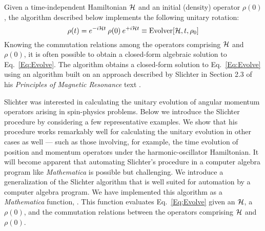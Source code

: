 %
%
%
%
%
%
%
%
%

\cite{Helton2015feb} \cite{Levitt2015mar}

Given a time-independent Hamiltonian ${\cal H}$ and an initial (density) operator $\rho(0)$, the  algorithm described below implements the following unitary rotation:
\begin{equation}
\rho(t) 
	= e^{-i {\cal H} t} \: \rho(0) \: e^{+i {\cal H} t}
	\equiv \text{{Evolver}}[{\cal H},t,\rho_0]
	\label{Eq:Evolve}
\end{equation}
Knowing the commutation relations among the operators comprising ${\cal H}$ and $\rho(0)$, it is often possible to obtain a closed-form algebraic solution to Eq.~\ref{Eq:Evolve}.  The  algorithm obtains a closed-form solution to Eq.~\ref{Eq:Evolve} using an algorithm built on an approach described by Slichter in Section 2.3 of his \emph{Principles of Magnetic Resonance} text \cite{Slichter1990}.

Slichter was interested in calculating the unitary evolution of angular momentum operators arising in spin-physics problems.  Below we introduce the Slichter procedure by considering a few representative examples.  We show that his procedure works remarkably well for calculating the unitary evolution in other cases as well --- such as those involving, for example, the time evolution of position and momentum operators under the harmonic-oscillator Hamiltonian.  It will become apparent that automating Slichter's procedure in a computer algebra program like \emph{Mathematica} is possible but challenging.  We introduce a generalization of the Slichter algorithm that is well suited for automation by a computer algebra program.  We have implemented this algorithm as a \emph{Mathematica} function, .  This function evaluates Eq.~\ref{Eq:Evolve} given an ${\cal H}$, a $\rho(0)$, and the commutation relations between the operators comprising ${\cal H}$ and $\rho(0)$.

